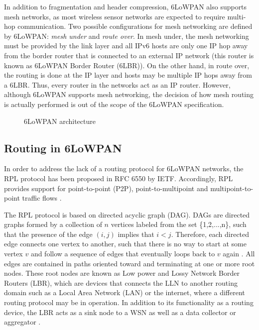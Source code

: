 \documentclass[final,authoryear,3p,twocolumn]{elsarticle}
\begin{document}
In addition to fragmentation and header compression, 6LoWPAN also supports mesh networks, as most wireless sensor networks are expected to require multi-hop communication. Two possible configurations for mesh networking are defined by 6LoWPAN: \textit{mesh under} and \textit{route over}. In mesh under, the mesh networking must be provided by the link layer and all IPv6 hosts are only one IP hop away from the border router that is connected to an external IP network (this router is known as 6LoWPAN Border Router (6LBR)). On the other hand, in route over, the routing is done at the IP layer and hosts may be multiple IP hops away from a 6LBR. Thus, every router in the networks act as an IP router. However, although 6LoWPAN supports mesh networking, the decision of how mesh routing is actually performed is out of the scope of the 6LoWPAN specification.

\begin{figure}
\centering
{}
\caption{6LoWPAN architecture}
\label{stack_6lowpan}
\end{figure}

\subsection{Routing in 6LoWPAN}
In order to address the lack of a routing protocol for 6LoWPAN networks, the RPL protocol has been proposed in RFC 6550 by IETF. Accordingly, RPL provides support for point-to-point (P2P), point-to-multipoint and multipoint-to-point traffic flows \citep{RFC6550}.

The RPL protocol is based on directed acyclic graph (DAG). DAGs are directed graphs formed by a collection of $n$ vertices labeled from the set \{1,2,...,n\}, such that the presence of the edge $(i,j)$ implies that $i < j$. Therefore, each directed edge connects one vertex to another, such that there is no way to start at some vertex $v$ and follow a sequence of edges that eventually loops back to $v$ again \citep{DAGS_1992}. All edges are contained in paths oriented toward and terminating at one or more root nodes. These root nodes are known as Low power and Lossy Network Border Routers (LBR), which are devices that connects the LLN to another routing domain such as a Local Area Network (LAN) or the internet, where a different routing protocol may be in operation. In addition to its functionality as a routing device, the LBR acts as a sink node to a WSN as well as a data collector or aggregator \citep{RFC7102}.
\end{document}
